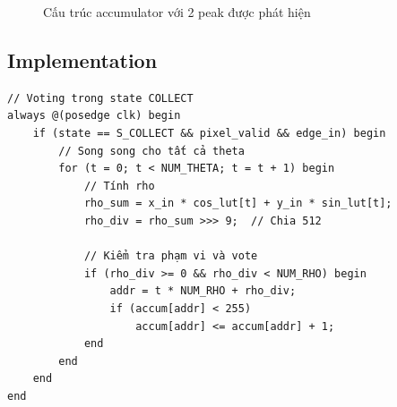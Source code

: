 \documentclass[12pt,a4paper]{report}
\begin{document}
\begin{figure}[H]
\centering
{}
\caption{Cấu trúc accumulator với 2 peak được phát hiện}
\label{fig:accumulator}
\end{figure}

\subsection{Implementation}
\begin{lstlisting}[caption={Accumulator voting logic}, label={lst:voting}]
// Voting trong state COLLECT
always @(posedge clk) begin
    if (state == S_COLLECT && pixel_valid && edge_in) begin
        // Song song cho tất cả theta
        for (t = 0; t < NUM_THETA; t = t + 1) begin
            // Tính rho
            rho_sum = x_in * cos_lut[t] + y_in * sin_lut[t];
            rho_div = rho_sum >>> 9;  // Chia 512
            
            // Kiểm tra phạm vi và vote
            if (rho_div >= 0 && rho_div < NUM_RHO) begin
                addr = t * NUM_RHO + rho_div;
                if (accum[addr] < 255)
                    accum[addr] <= accum[addr] + 1;
            end
        end
    end
end
\end{lstlisting}
\end{document}
